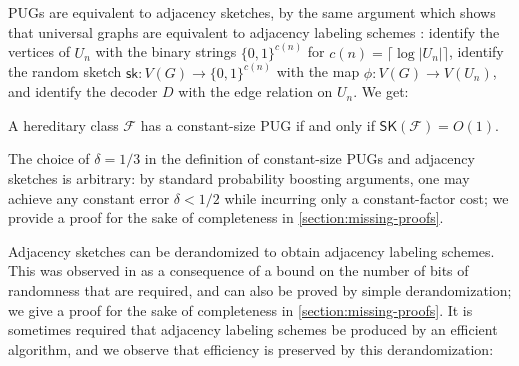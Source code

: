 \documentclass{article}
\makeatletter
\DeclareMathOperator{\poly}{poly}
\newcommand{\ceil}[1]{\ensuremath{\lceil #1 \rceil}}
\newcommand{\zo}{\{0,1\}}
\newcommand{\cF}{\ensuremath{\mathcal{F}}}
\newcommand{\bN}{\ensuremath{\mathbb{N}}}
\newcommand{\sk}{\mathsf{sk}}
\newcommand{\RL}{\mathsf{SK}}
\newcommand\IfRestateTF{%
  \ifx\label\thmt@gobble@label %
    \expandafter\@firstoftwo
  \else
    \expandafter\@secondoftwo
  \fi
}
\newcommand{\RestateRemark}{\IfRestateTF{{\normalfont\bfseries (Restated) }}{}}
\makeatother
\begin{document}
PUGs are equivalent to adjacency sketches, by the same argument which shows that universal graphs
are equivalent to adjacency labeling schemes \cite{KNR92}: identify the
vertices of $U_n$ with the binary strings $\zo^{c(n)}$ for $c(n) = \ceil{\log |U_n|}$, identify the
random sketch $\sk : V(G) \to \zo^{c(n)}$ with the map $\phi : V(G) \to V(U_n)$, and identify the
decoder $D$ with the edge relation on $U_n$. We get:

\begin{proposition}
\label{prop:pug labeling equivalence}
A hereditary class $\cF$ has a constant-size PUG if and only if $\RL(\cF) = O(1)$.
\end{proposition}

The choice of $\delta=1/3$ in the definition of constant-size PUGs and adjacency sketches
is arbitrary: by standard probability boosting arguments, one may achieve any constant error
$\delta < 1/2$ while incurring only a constant-factor cost; we provide a proof for the sake of
completeness in \cref{section:missing-proofs}.


Adjacency sketches can be derandomized to obtain adjacency labeling schemes. This was observed in
\cite{Har20} as a consequence of a bound on the number of bits of randomness that are required, and
can also be proved by simple derandomization; we give a proof for the sake of completeness in
\cref{section:missing-proofs}. It is sometimes required that adjacency labeling schemes be produced by
an efficient algorithm, and we observe that efficiency is preserved by this derandomization:

\end{document}
